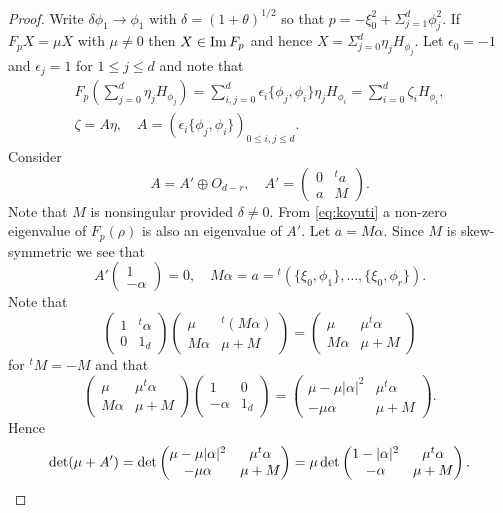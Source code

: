 \documentclass[12pt,leqno]{article} %
\def\al{\alpha}
\def\ep{\epsilon}
\numberwithin{equation}{section}
\begin{document}
\begin{proof}
Write $\delta\phi_1\to \phi_1$ with $\delta=(1+\theta)^{1/2}$  so that $p=-\xi_0^2+\Sigma_{j=1}^d\phi_j^2$.  If $F_pX=\mu X$ with $\mu\neq 0$ then $X\in {\rm Im\,}F_p$ and hence $X=\Sigma_{j=0}^d\eta_jH_{\phi_j}$. Let $\ep_0=-1$ and $\ep_j=1$ for $1\leq j\leq d$ and note that
%
\begin{equation}
\label{eq:koyuti}
\begin{split}
F_p (\sum_{j=0}^d\eta_jH_{\phi_j})=\sum_{i,j=0}^d\ep_i\{\phi_j,\phi_i\}\eta_jH_{\phi_i}=\sum_{i=0}^d\zeta_iH_{\phi_i},\\
 \zeta=A\eta,\quad A=(\ep_i\{\phi_j,\phi_i\})_{0\leq i,j\leq d}.
\end{split}
\end{equation}
%
Consider
%
\[
A=A'\oplus O_{d-r},\quad A'=\begin{pmatrix}0&{^t} a\\
 a&M
\end{pmatrix}.
\]
%
Note that $M$ is nonsingular provided $\delta\neq 0$.
From \eqref{eq:koyuti} a non-zero eigenvalue of $F_p(\rho)$ is also an eigenvalue of $A'$. 
Let $ a=M\al$. Since $M$ is skew-symmetric we see that
%
\begin{equation}
\label{eq:M:a}
A'\begin{pmatrix}1\\
-{\al}\end{pmatrix}=0,\quad M\al=a={^t}(\{\xi_0,\phi_1\},\ldots,\{\xi_0,\phi_r\}).
\end{equation}
%
Note that
%
\[
\begin{pmatrix}1&{^t}\al\\
0&1_d
\end{pmatrix}
\begin{pmatrix}\mu&{^t}(M\al)\\
M\al&\mu+M
\end{pmatrix}=\begin{pmatrix}\mu&\mu{^t}\al\\
M\al&\mu+M
\end{pmatrix}
\]
%
for ${^t}M=-M$ and that
%
\[
\begin{pmatrix}\mu&\mu{^t}\al\\
M\al&\mu+M
\end{pmatrix}\begin{pmatrix}1&0\\
-\al&1_d
\end{pmatrix}=\begin{pmatrix}\mu-\mu|\al|^2&\mu{^t}\al\\
-\mu\al&\mu+M
\end{pmatrix}.
\]
%
 Hence
%
\[
{\rm det}(\mu+A')={\rm det}\begin{pmatrix}\mu-\mu|\al|^2&\mu{^t}\al\\
-\mu\al&\mu+M
\end{pmatrix}=\mu\,{\rm det}\begin{pmatrix}1-|\al|^2&\mu{^t}\al\\
-\al&\mu+M
\end{pmatrix}.
\]
%


\end{proof}
\end{document}
